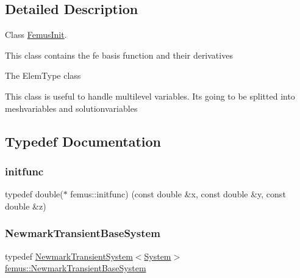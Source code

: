 \subsection{Detailed Description}
Class \mbox{\hyperlink{classfemus_1_1_femus_init}{Femus\+Init}}. 

This class contains the fe basis function and their derivatives

The Elem\+Type class

This class is useful to handle multilevel variables. It\textquotesingle{}s going to be splitted into meshvariables and solutionvariables 

\subsection{Typedef Documentation}
\mbox{\label{namespacefemus_a302d9e134a6241196658a9e34bf01c21}} 
\subsubsection{\texorpdfstring{initfunc}{initfunc}}
{\footnotesize\ttfamily typedef double($\ast$ femus\+::initfunc) (const double \&x, const double \&y, const double \&z)}

\mbox{\label{namespacefemus_aa275ff8b74e4574efb9674fd2b0c9370}} 
\subsubsection{\texorpdfstring{Newmark\+Transient\+Base\+System}{NewmarkTransientBaseSystem}}
{\footnotesize\ttfamily typedef \mbox{\hyperlink{classfemus_1_1_newmark_transient_system}{Newmark\+Transient\+System}}$<$\mbox{\hyperlink{classfemus_1_1_system}{System}}$>$ \mbox{\hyperlink{namespacefemus_aa275ff8b74e4574efb9674fd2b0c9370}{femus\+::\+Newmark\+Transient\+Base\+System}}}

\mbox{\label{namespacefemus_a71e6e02a22e2439b850a9d6f3207ad1e}} 
